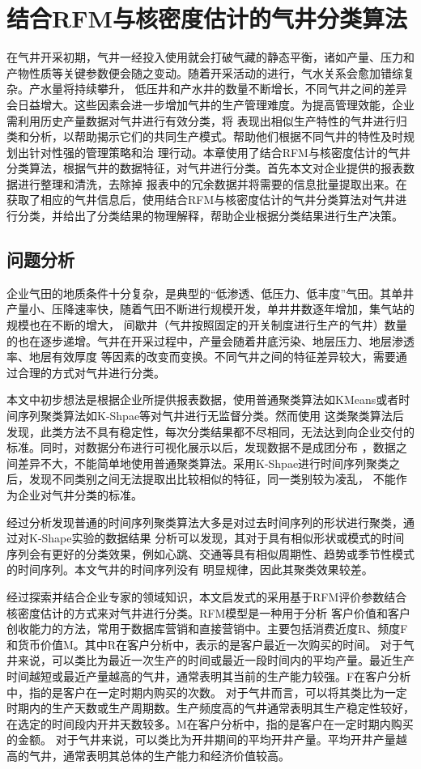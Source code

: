 \chapter{结合RFM与核密度估计的气井分类算法}
在气井开采初期，气井一经投入使用就会打破气藏的静态平衡，诸如产量、压力和产物性质等关键参数便会随之变动。随着开采活动的进行，气水关系会愈加错综复杂。产水量将持续攀升，
低压井和产水井的数量不断增长，不同气井之间的差异会日益增大。这些因素会进一步增加气井的生产管理难度。为提高管理效能，企业需利用历史产量数据对气井进行有效分类，将
表现出相似生产特性的气井进行归类和分析，以帮助揭示它们的共同生产模式。帮助他们根据不同气井的特性及时规划出针对性强的管理策略和治
理行动。本章使用了结合RFM与核密度估计的气井分类算法，根据气井的数据特征，对气井进行分类。首先本文对企业提供的报表数据进行整理和清洗，去除掉
报表中的冗余数据并将需要的信息批量提取出来。在获取了相应的气井信息后，使用结合RFM与核密度估计的气井分类算法对气井进行分类，并给出了分类结果的物理解释，帮助企业根据分类结果进行生产决策。
\section{问题分析}
企业气田的地质条件十分复杂，是典型的“低渗透、低压力、低丰度”气田。其单井产量小、压降速率快，随着气田不断进行规模开发，单井井数逐年增加，集气站的规模也在不断的增大，
间歇井（气井按照固定的开关制度进行生产的气井）数量的也在逐步递增。气井在开采过程中，产量会随着井底污染、地层压力、地层渗透率、地层有效厚度
等因素的改变而变换。不同气井之间的特征差异较大，需要通过合理的方式对气井进行分类。

本文中初步想法是根据企业所提供报表数据，使用普通聚类算法如KMeans或者时间序列聚类算法如K-Shpae等对气井进行无监督分类。然而使用
这类聚类算法后发现，此类方法不具有稳定性，每次分类结果都不尽相同，无法达到向企业交付的标准。同时，对数据分布进行可视化展示以后，发现数据不是成团分布
，数据之间差异不大，不能简单地使用普通聚类算法。采用K-Shpae进行时间序列聚类之后，发现不同类别之间无法提取出比较相似的特征，同一类别较为凌乱，
不能作为企业对气井分类的标准。

经过分析发现普通的时间序列聚类算法大多是对过去时间序列的形状进行聚类，通过对K-Shape实验的数据结果\cite{Kshapeexperiment}
分析可以发现，其对于具有相似形状或模式的时间序列会有更好的分类效果，例如心跳、交通等具有相似周期性、趋势或季节性模式的时间序列。本文气井的时间序列没有
明显规律，因此其聚类效果较差。

经过探索并结合企业专家的领域知识，本文启发式的采用基于RFM评价参数结合核密度估计的方式来对气井进行分类。RFM模型是一种用于分析
客户价值和客户创收能力的方法，常用于数据库营销和直接营销中。主要包括消费近度R、频度F和货币价值M。其中R在客户分析中，表示的是客户最近一次购买的时间。
对于气井来说，可以类比为最近一次生产的时间或最近一段时间内的平均产量。最近生产时间越短或最近产量越高的气井，通常表明其当前的生产能力较强。F在客户分析中，指的是客户在一定时期内购买的次数。
对于气井而言，可以将其类比为一定时期内的生产天数或生产周期数。生产频度高的气井通常表明其生产稳定性较好，在选定的时间段内开井天数较多。M在客户分析中，指的是客户在一定时期内购买的金额。
对于气井来说，可以类比为开井期间的平均开井产量。平均开井产量越高的气井，通常表明其总体的生产能力和经济价值较高。

